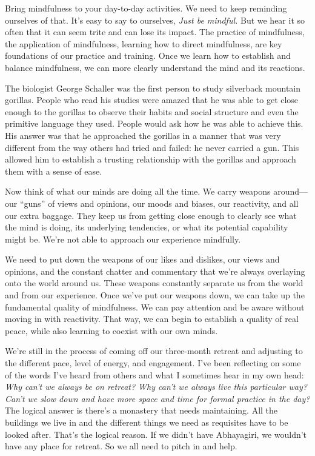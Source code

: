 
Bring mindfulness to your day-to-day activities. We need to keep 
reminding ourselves of that. It's easy to say to ourselves, \emph{Just 
be mindful.} But we hear it so often that it can seem trite and can 
lose its impact. The practice of mindfulness, the application of 
mindfulness, learning how to direct mindfulness, are key foundations of 
our practice and training. Once we learn how to establish and balance 
mindfulness, we can more clearly understand the mind and its reactions.

The biologist George Schaller was the first person to study silverback 
mountain gorillas. People who read his studies were amazed that he was 
able to get close enough to the gorillas to observe their habits and 
social structure and even the primitive language they used. People 
would ask how he was able to achieve this. His answer was that he 
approached the gorillas in a manner that was very different from the 
way others had tried and failed: he never carried a gun. This allowed 
him to establish a trusting relationship with the gorillas and approach 
them with a sense of ease.

Now think of what our minds are doing all the time. We carry weapons 
around---our ``guns'' of views and opinions, our moods and biases, our 
reactivity, and all our extra baggage. They keep us from getting close 
enough to clearly see what the mind is doing, its underlying 
tendencies, or what its potential capability might be. We're not able 
to approach our experience mindfully.

We need to put down the weapons of our likes and dislikes, our views 
and opinions, and the constant chatter and commentary that we're always 
overlaying onto the world around us. These weapons constantly separate 
us from the world and from our experience. Once we've put our weapons 
down, we can take up the fundamental quality of mindfulness. We can pay 
attention and be aware without moving in with reactivity. That way, we 
can begin to establish a quality of real peace, while also learning to 
coexist with our own minds.


We're still in the process of coming off our three-month retreat and 
adjusting to the different pace, level of energy, and engagement. I've 
been reflecting on some of the words I've heard from others and what I 
sometimes hear in my own head: \emph{Why can't we always be on retreat? 
Why can't we always live this particular way? Can't we slow down and 
have more space and time for formal practice in the day?} The logical 
answer is there's a monastery that needs maintaining. All the buildings 
we live in and the different things we need as requisites have to be 
looked after. That's the logical reason. If we didn't have Abhayagiri, 
we wouldn't have any place for retreat. So we all need to pitch in and 
help.

